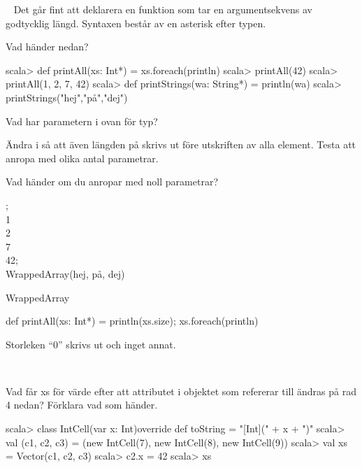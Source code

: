 
\QUESTBEGIN

\Task  \what~  Det går fint att deklarera en funktion som tar en argumentsekvens av godtycklig längd. Syntaxen består av en asterisk \code{*} efter typen.

\Subtask Vad händer nedan?
\begin{REPL}
scala> def printAll(xs: Int*) = xs.foreach(println)
scala> printAll(42)
scala> printAll(1, 2, 7, 42)
scala> def printStrings(wa: String*) = println(wa)
scala> printStrings("hej","på","dej")
\end{REPL}

\Subtask Vad har parametern  i  ovan för typ?

\Subtask Ändra i  så att även längden på  skrivs ut före utskriften av alla element. Testa att anropa  med olika antal parametrar.

\Subtask Vad händer om du anropar  med noll parametrar?

\SOLUTION


\TaskSolved \what


;\\
 1\\
 2\\
 7\\
 42;\\
 WrappedArray(hej, på, dej)

\SubtaskSolved  WrappedArray

\SubtaskSolved  def printAll(xs: Int*) = {println(xs.size); xs.foreach(println)}

\SubtaskSolved  Storleken “0” skrivs ut och inget annat.




\QUESTEND









\QUESTBEGIN

\Task  \what~

\Subtask Vad får xs för värde efter att attributet i objektet som  refererar till ändras på rad 4 nedan? Förklara vad som händer.
\begin{REPL}
scala> class IntCell(var x: Int){override def toString = "[Int](" + x + ")"}
scala> val (c1, c2, c3) = (new IntCell(7), new IntCell(8), new IntCell(9))
scala> val xs = Vector(c1, c2, c3)
scala> c2.x = 42
scala> xs
\end{REPL}

